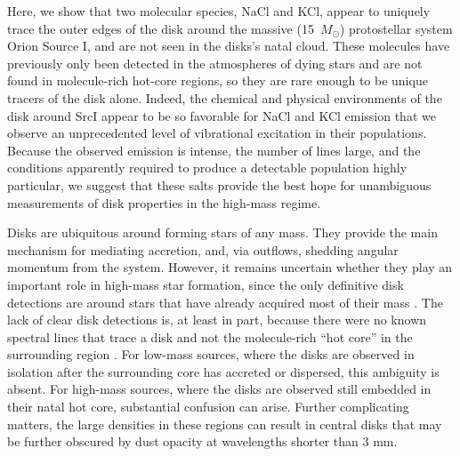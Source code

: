 \documentclass[12pt]{article}
\newcommand{\bam}[1]{\textcolor{green!65!black}{\textbf{[BAM: #1]}}}
\newcommand{\sourcei}{SrcI\xspace}
\newcommand{\msun}{\ensuremath{M_{\odot}}\xspace}			%
\begin{document}
Here, we show that two molecular species, NaCl and KCl, appear to uniquely
trace the
outer edges of the disk around the massive (15~\msun) protostellar system Orion
Source I, and are not seen in the disks's natal cloud. These molecules have
previously only been detected in the atmospheres
of dying stars and are not found in molecule-rich hot-core regions, so they
are rare enough to be unique tracers of the disk alone.  Indeed, the chemical
and physical environments of the disk around \sourcei appear to be so
favorable for NaCl and KCl emission that we observe an unprecedented level of
vibrational excitation in their populations.  Because the observed emission is
intense, the number of lines large, and the conditions apparently required to
produce a detectable population highly particular, we suggest that
these salts provide the best hope for unambiguous measurements of disk
properties in the high-mass regime.

Disks are ubiquitous around forming stars of any mass.  They provide the main
mechanism for mediating accretion, and, via outflows, shedding angular momentum
from the system.  However, it remains uncertain whether they play an important
role in high-mass star formation, since the only definitive disk detections are
around stars that have already acquired most of their mass
\cite{Girart2017a,Ginsburg2018b}.  The lack of clear disk detections is, at
least in part, because there were no known spectral lines that trace a disk and
not the molecule-rich ``hot core'' in the surrounding region
\cite{Goddi2018a,Cesaroni2017a}.  For low-mass sources, where the disks are
observed in isolation after the surrounding core has accreted or dispersed,
this ambiguity is absent.  For high-mass sources, where the disks are observed
still embedded in their natal hot core, substantial confusion can arise.
Further complicating matters, the large densities in these regions can result
in central disks that may be further obscured by dust opacity at wavelengths
shorter than 3 mm.

\end{document}
